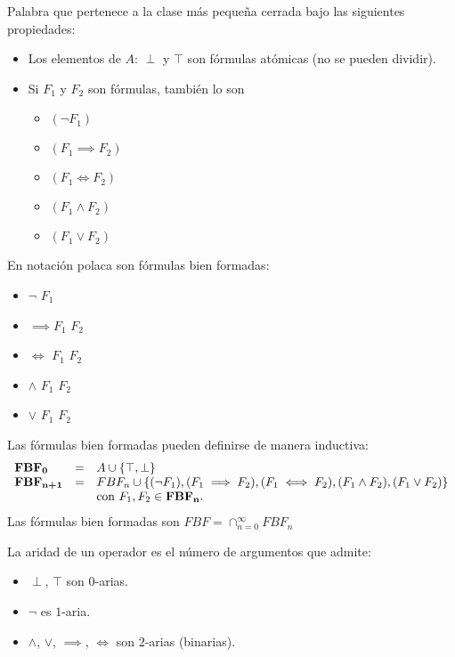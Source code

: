 \begin{defn}
	Palabra que pertenece a la clase más pequeña cerrada bajo las siguientes propiedades:
	\begin{itemize}
		\item Los elementos de $A$: $\perp$ y $\top$ son fórmulas atómicas (no se pueden dividir).
		\item Si $F_1$ y $F_2$ son fórmulas, también lo son
		\begin{itemize}
			\item $(\neg F_1)$
			\item $(F_1\implies F_2)$
			\item $(F_1\iff F_2)$
			\item $(F_1\wedge F_2)$
			\item $(F_1\vee F_2)$
		\end{itemize}
	\end{itemize}
	En notación polaca son fórmulas bien formadas:
	\begin{itemize}
		\item $\neg$ $F_1$
		\item $\implies F_1$ $F_2$
		\item $\iff$ $F_1$ $F_2$
		\item $\wedge$ $F_1$ $F_2$
		\item $\vee$ $F_1$ $F_2$
	\end{itemize}
\end{defn}

\noindent Las fórmulas bien formadas pueden definirse de manera inductiva:
\begin{equation*}
\begin{array}{l l l}
	\textbf{FBF}_\textbf{0} &=& A\cup\{\top, \perp \}\\
	\textbf{FBF}_\textbf{n+1} &=& FBF_n \cup \{(\neg F_1), (F_1\implies F_2),(F_1\iff F_2),(F_1\wedge F_2),(F_1\vee F_2)\}\\ &&\text{con } F_1,F_2\in \textbf{FBF}_\textbf{n}.
\end{array}
\end{equation*}
Las fórmulas bien formadas son $FBF=\cap_{n=0}^\infty FBF_n$

\begin{defn}[Aridad]
	La aridad de un operador es el número de argumentos que admite:
	\begin{itemize}
		\item $\perp$, $\top$ son $0$-arias.
		\item $\neg$ es $1$-aria.
		\item $\wedge$, $\vee$, $\implies$, $\iff$ son $2$-arias (binarias).
	\end{itemize}
\end{defn}

